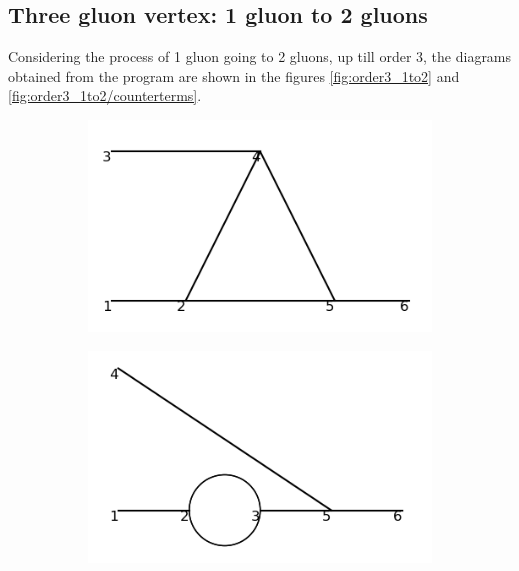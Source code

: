 \documentclass[11pt,a4paper,twoside,pdf]{article}
\numberwithin{equation}{section}
\begin{document}
\subsection{Three gluon vertex: 1 gluon to 2 gluons}

Considering the process of 1 gluon going to 2 gluons, up till 
order 3, the diagrams obtained from the program are shown in the figures 
\ref{fig:order3_1to2} and \ref{fig:order3_1to2/counterterms}.

\begin{figure}[h!]
    \centering
    \begin{subfigure}[t]{0.24\textwidth}
        \centering
        \includegraphics[width=\textwidth]{plots/order3/order3_1to2/1.png}
        \caption{ }
    \end{subfigure}%
    \hfill
    \begin{subfigure}[t]{0.24\textwidth}
        \centering
        \includegraphics[width=\textwidth]{plots/order3/order3_1to2/2.png}
        \caption{ }
    \end{subfigure}

\end{figure}
\end{document}
